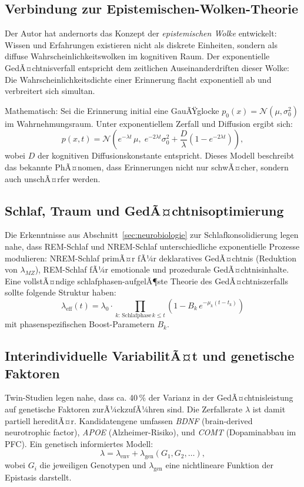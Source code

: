 ﻿\documentclass[12pt,a4paper,twoside]{article}
\theoremstyle{theormstyle}
\theoremstyle{proofstyle}
\begin{document}
	\subsection{Verbindung zur Epistemischen-Wolken-Theorie}
	
	Der Autor hat andernorts \citep{epp2026subgraph} das Konzept der
	\emph{epistemischen Wolke} entwickelt: Wissen und Erfahrungen existieren
	nicht als diskrete Einheiten, sondern als diffuse Wahrscheinlichkeitswolken
	im kognitiven Raum. Der exponentielle GedÃ¤chtnisverfall entspricht
	dem zeitlichen Auseinanderdriften dieser Wolke: Die Wahrscheinlichkeitsdichte
	einer Erinnerung flacht exponentiell ab und verbreitert sich simultan.
	
	Mathematisch: Sei die Erinnerung initial eine GauÃŸglocke
	$p_0(x) = \mathcal{N}(\mu, \sigma_0^2)$ im Wahrnehmungsraum.
	Unter exponentiellem Zerfall und Diffusion ergibt sich:
	\[
	p(x, t) = \mathcal{N}\!\left(e^{-\lambda t}\,\mu,\;
	e^{-2\lambda t}\sigma_0^2 + \frac{D}{\lambda}(1-e^{-2\lambda t})\right),
	\]
	wobei $D$ der kognitiven Diffusionskonstante entspricht.
	Dieses Modell beschreibt das bekannte PhÃ¤nomen, dass Erinnerungen
	nicht nur schwÃ¤cher, sondern auch unschÃ¤rfer werden.
	
	\subsection{Schlaf, Traum und GedÃ¤chtnisoptimierung}
	
	Die Erkenntnisse aus Abschnitt~\ref{sec:neurobiologie} zur
	Schlafkonsolidierung legen nahe, dass REM-Schlaf und NREM-Schlaf
	unterschiedliche exponentielle Prozesse modulieren:
	NREM-Schlaf primÃ¤r fÃ¼r deklaratives GedÃ¤chtnis (Reduktion von $\lambda_{MZ}$),
	REM-Schlaf fÃ¼r emotionale und prozedurale GedÃ¤chtnisinhalte.
	Eine vollstÃ¤ndige schlafphasen-aufgelÃ¶ste Theorie des GedÃ¤chtniszerfalls
	sollte folgende Struktur haben:
	\[
	\lambda_{\mathrm{eff}}(t)
	= \lambda_0 \cdot \prod_{k:\,\text{Schlafphase}\,k\leq t}
	(1 - B_k\,e^{-\mu_k(t-t_k)})
	\]
	mit phasenspezifischen Boost-Parametern $B_k$.
	
	\subsection{Interindividuelle VariabilitÃ¤t und genetische Faktoren}
	
	Twin-Studien legen nahe, dass ca. 40\,\% der Varianz in der
	GedÃ¤chtnisleistung auf genetische Faktoren zurÃ¼ckzufÃ¼hren sind.
	Die Zerfallsrate $\lambda$ ist damit partiell hereditÃ¤r.
	Kandidatengene umfassen \textit{BDNF} (brain-derived neurotrophic factor),
	\textit{APOE} (Alzheimer-Risiko), und \textit{COMT} (Dopaminabbau im PFC).
	Ein genetisch informiertes Modell:
	\[
	\lambda = \lambda_{\mathrm{env}} + \lambda_{\mathrm{gen}}(G_1, G_2, \ldots),
	\]
	wobei $G_i$ die jeweiligen Genotypen und $\lambda_{\mathrm{gen}}$
	eine nichtlineare Funktion der Epistasis darstellt.
	
\end{document}
